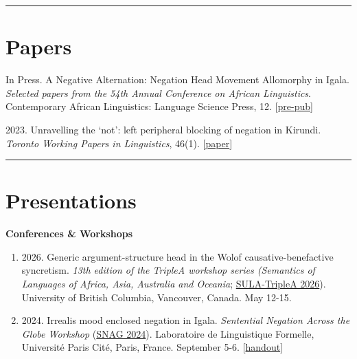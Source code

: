 \documentclass[margin,line]{resume}
\begin{document}
\begin{resume}
	\vspace{-1.5em}
	
	\rule{\textwidth}{0.4pt}




	\vspace{-0.7em}

	\section{\mysidestyle Papers}

	 {In Press. A Negative Alternation: Negation Head Movement Allomorphy in Igala. \textit{Selected papers from the 54th Annual Conference on African Linguistics}. Contemporary African Linguistics: Language Science Press, 12. [\href{run:../papers/chaperon_acal_neg_move.pdf}{pre-pub}]}

	 {2023. Unravelling the `not': left peripheral blocking of negation in Kirundi. \textit{Toronto Working Papers in Linguistics}, 46(1). [\href{https://twpl.library.utoronto.ca/index.php/twpl/article/view/39257}{paper}]}%

	\vspace{-0.9em}\rule{\textwidth}{0.4pt}
	

	\vspace{-0.5em}

	\section{\mysidestyle Presentations}

	\textbf{Conferences \& Workshops}
	\begin{enumerate}[-, leftmargin=1em, topsep=2pt]
		
		\item[] {2026. Generic argument-structure head in the Wolof causative-benefactive syncretism. {\it 13th edition of the TripleA workshop series (Semantics of Languages of Africa, Asia, Australia and Oceania}; \href{https://blogs.ubc.ca/sulatriplea/}{SULA-TripleA 2026}). University of British Columbia, Vancouver, Canada. May 12-15.}

		\item[] {2024. Irrealis mood enclosed negation in Igala. {\it Sentential Negation Across the Globe Workshop} (\href{https://parissnag.com/conf}{SNAG 2024}). Laboratoire de Linguistique Formelle, Universit\'{e} Paris Cit\'{e}, Paris, France. September 5-6. [\href{https://parissnag.com/conf/program/chaperon}{handout}]}
		

\end{enumerate}
\end{resume}
\end{document}
